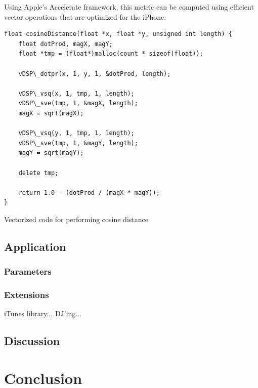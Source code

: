 \documentclass[a4paper,10pt,final]{ThesisStyle}
\begin{document}
Using Apple's Accelerate framework, this metric can be computed using efficient vector operations that are optimized for the iPhone:
\clearpage
\begin{program}
\begin{verbatim}
float cosineDistance(float *x, float *y, unsigned int length) {
	float dotProd, magX, magY;
	float *tmp = (float*)malloc(count * sizeof(float));
	
	vDSP\_dotpr(x, 1, y, 1, &dotProd, length);
	
	vDSP\_vsq(x, 1, tmp, 1, length);
	vDSP\_sve(tmp, 1, &magX, length);
	magX = sqrt(magX);
	
	vDSP\_vsq(y, 1, tmp, 1, length);
	vDSP\_sve(tmp, 1, &magY, length);
	magY = sqrt(magY);
	
	delete tmp;
	
	return 1.0 - (dotProd / (magX * magY));
}
\end{verbatim}
\caption{Vectorized code for performing cosine distance}
\end{program}

\subsection{Application}

\subsubsection{Parameters}
\label{subsec:parameters}


\subsubsection{Extensions}

iTunes library... DJ'ing... 

\subsection{Discussion}

\section{Conclusion}



\end{document}
